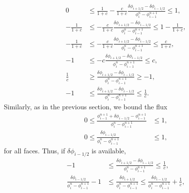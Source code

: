 \documentclass[../thesis.tex]{subfiles}
\begin{document}
\begin{equation}
    \begin{split}
        0
        &\leq
        \frac{1}{1+c}
        -\frac{c}{1+c}\frac{\delta \phi_{i+1/2} - \delta \phi_{i-1/2}}
        {\phi_{i}^{n} - \phi_{i-1}^{n+1}}
        \leq
        1,
        \\
        -\frac{1}{1+c}
        &\leq
        -\frac{c}{1+c}\frac{\delta \phi_{i+1/2} - \delta \phi_{i-1/2}}
        {\phi_{i}^{n} - \phi_{i-1}^{n+1}}
        \leq
        1-\frac{1}{1+c},
        \\
        -\frac{1}{1+c}
        &\leq
        -\frac{c}{1+c}\frac{\delta \phi_{i+1/2} - \delta \phi_{i-1/2}}
        {\phi_{i}^{n} - \phi_{i-1}^{n+1}}
        \leq
        \frac{c}{1+c},
        \\
        -1
        &\leq
        -c\frac{\delta \phi_{i+1/2} - \delta \phi_{i-1/2}}
        {\phi_{i}^{n} - \phi_{i-1}^{n+1}}
        \leq
        c,
        \\
        \frac{1}{c}
        &\geq
        \frac{\delta \phi_{i+1/2} - \delta \phi_{i-1/2}}
        {\phi_{i}^{n} - \phi_{i-1}^{n+1}}
        \geq
        -1,
        \\
        -1
        &\leq
        \frac{\delta \phi_{i+1/2} - \delta \phi_{i-1/2}}
        {\phi_{i}^{n} - \phi_{i-1}^{n+1}}
        \leq
        \frac{1}{c}.
    \end{split}
\end{equation}
Similarly, as in the previous section, we bound the flux
\begin{equation}
    \label{eqn:HO-correction-bounds}
    \begin{split}
        0
        \leq
        \frac{\phi_{i-1}^{n+1} + \delta \phi_{i-1/2} - \phi_{i-1}^{n+1}}
        {\phi_{i}^{n} - \phi_{i-1}^{n+1}}
        &\leq
        1,
        \\
        0
        \leq
        \frac{\delta \phi_{i-1/2}}
        {\phi_{i}^{n} - \phi_{i-1}^{n+1}}
        &\leq
        1,
    \end{split}
\end{equation}
for all faces.
Thus, if \(\delta \phi_{i-1/2}\) is available,
\begin{equation}
    \begin{split}
        -1
        &\leq
        \frac{\delta \phi_{i+1/2} - \delta \phi_{i-1/2}}
        {\phi_{i}^{n} - \phi_{i-1}^{n+1}}
        \leq
        \frac{1}{c},
        \\
        \frac{\delta \phi_{i-1/2}}
        {\phi_{i}^{n} - \phi_{i-1}^{n+1}}
        -1
        &\leq
        \frac{\delta \phi_{i+1/2}}
        {\phi_{i}^{n} - \phi_{i-1}^{n+1}}
        \leq
        \frac{\delta \phi_{i-1/2}}
        {\phi_{i}^{n} - \phi_{i-1}^{n+1}}
        +\frac{1}{c},
    \end{split}
\end{equation}
\end{document}
